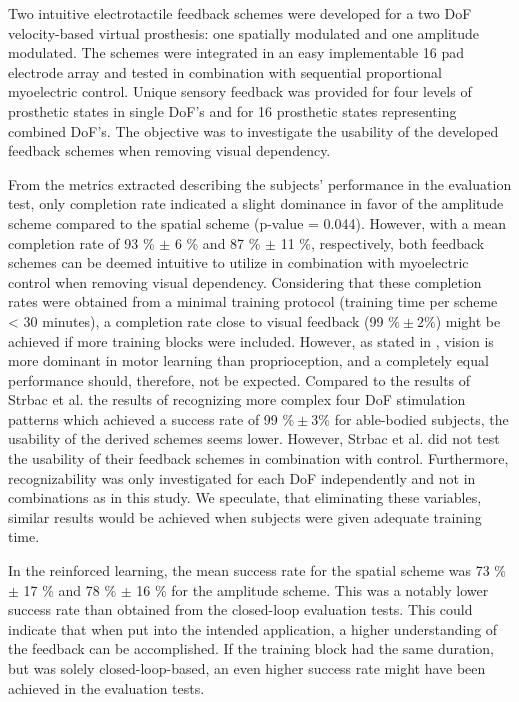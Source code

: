 Two intuitive electrotactile feedback schemes were developed for a two DoF velocity-based virtual prosthesis: one spatially modulated and one amplitude modulated. The schemes were integrated in an easy implementable 16 pad electrode array and tested in combination with sequential proportional myoelectric control. Unique sensory feedback was provided for four levels of prosthetic states in single DoF's and for 16 prosthetic states representing combined DoF's. The objective was to investigate the usability of the developed feedback schemes when removing visual dependency.

From the metrics extracted describing the subjects' performance in the evaluation test, only completion rate indicated a slight  dominance in favor of the amplitude scheme compared to the spatial scheme (p-value = 0.044). However, with a mean completion rate of 93 \% $\pm$ 6 \% and 87 \% $\pm$ 11 \%, respectively, both feedback schemes can be deemed intuitive to utilize in combination with myoelectric control when removing visual dependency. Considering that these completion rates were obtained from a minimal training protocol (training time per scheme < 30 minutes), a completion rate close to visual feedback (99 $\% \pm 2\%$) might be achieved if more training blocks were included. However, as stated in \cite{Adams1977}, vision is more dominant in motor learning than proprioception, and a completely equal performance should, therefore, not be expected.
Compared to the results of Strbac et al. \cite{Strbac2016} the results of recognizing more complex four DoF stimulation patterns which achieved a success rate of 99 $\% \pm 3\%$ for able-bodied subjects, the usability of the derived schemes seems lower. However, Strbac et al. did not test the usability of their feedback schemes in combination with control. Furthermore, recognizability was only investigated for each DoF independently and not in combinations as in this study. We speculate, that eliminating these variables, similar results would be achieved when subjects were given adequate training time.       

In the reinforced learning, the mean success rate for the spatial scheme was 73 \%  $\pm$ 17 \% and 78 \%  $\pm$ 16 \% for the amplitude scheme. This was a notably lower success rate than obtained from the closed-loop evaluation tests. This could indicate that when put into the intended application, a higher understanding of the feedback can be accomplished. If the training block had the same duration, but was solely closed-loop-based, an even higher success rate might have been achieved in the evaluation tests. 

